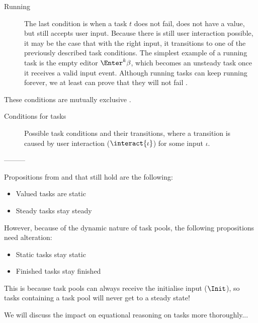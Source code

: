 \begin{description}
  \item[Running]
    The last condition is when a task $t$ does not fail, does not have a value, but still accepts user input.
    Because there is still user interaction possible, it may be the case that with the right input, it transitions to one of the previously described task conditions.
    The simplest example of a running task is the empty editor $\Enter^k \beta$, which becomes an unsteady task once it receives a valid input event.
    Although running tasks can keep running forever,
    we at least can prove that they will not fail .

\end{description}

These conditions are mutually exclusive .

\begin{table}[h]
  
  \caption{Conditions for tasks}
  \label{tab:task-conditions}
\end{table}

\begin{figure}[h]
  
  \caption{Possible task conditions and their transitions, where a transition is caused by user interaction ($\interact{\iota}$) for some input $\iota$.}
  \label{fig:task-conditions}
\end{figure}


---------






Propositions from \cite{Steenvoorden22} and \cite{Klijnsma2020} that still hold are the following:

\begin{itemize}
  \item Valued tasks are static
  \item Steady tasks stay steady
\end{itemize}

However, because of the dynamic nature of task pools, the following propositions need alteration:

\begin{itemize}
  \item Static tasks stay static
  \item Finished tasks stay finished
\end{itemize}

This is because task pools can always receive the initialise input ($\Init$),
so tasks containing a task pool will never get to a steady state!

We will discuss the impact on equational reasoning on tasks more thoroughly...